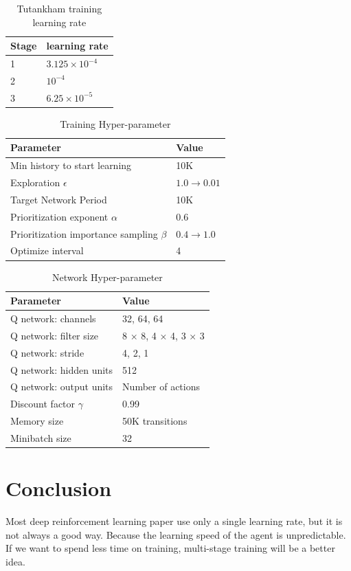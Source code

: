 \documentclass{article}
\begin{document}
\begin{table}[H]
\centering
\begin{tabular}{ll}
\hline
Stage  & learning rate \\
\hline
1 & $3.125 \times 10^{-4} $\\
2 & $10^{-4}$\\
3 & $6.25 \times 10^{-5}$ \\
\hline
\end{tabular}
\caption{Tutankham training learning rate}
\label{tab:plain}
\end{table}


\begin{table}[H]
\centering
\begin{tabular}{ll}
\hline
Parameter  & Value \\
\hline
Min history to start learning & 10K \\
Exploration $\epsilon$   & $1.0 \rightarrow 0.01$ \\
Target Network Period  & 10K \\
Prioritization exponent $\alpha$ & 0.6 \\
Prioritization importance sampling $\beta$    & $0.4 \rightarrow 1.0$ \\
Optimize interval & 4 \\
\hline
\end{tabular}
\caption{Training Hyper-parameter}
\label{tab:plain}
\end{table}

\begin{table}[H]
\centering
\begin{tabular}{ll}
\hline
Parameter  & Value \\
\hline
Q network: channels & 32, 64, 64 \\
Q network: filter size&  8 × 8, 4 × 4, 3 × 3\\
Q network: stride & 4, 2, 1\\
Q network: hidden units & 512\\
Q network: output units & Number of actions\\
Discount factor $\gamma$ & 0.99\\
Memory size & 50K transitions\\
Minibatch size & 32 \\
\hline
\end{tabular}
\caption{Network Hyper-parameter}
\label{tab:plain}
\end{table}

\section{Conclusion}
Most deep reinforcement learning paper use only a single learning rate, but it is not always a good way. Because the learning speed of the agent is unpredictable. If we want to spend less time on training, multi-stage training will be a better idea. 
\end{document}
